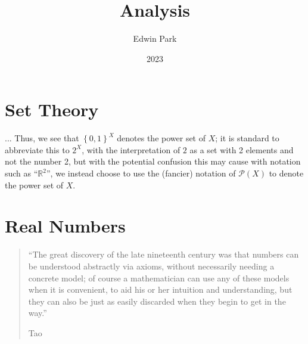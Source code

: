 \documentclass{article}
\title{Analysis}
\author{Edwin Park}
\date{2023}
\theoremstyle{definition}
\begin{document}
\clearpage\maketitle\thispagestyle{empty}
\newpage
\tableofcontents
\newpage\setcounter{page}{1}
\section{Set Theory}
... Thus, we see that $\left\{0,1\right\}^X$ denotes the power set of $X$; it is standard to abbreviate this to $2^X$, with the interpretation of $2$ as a set with 2 elements and not the number 2, but with the potential confusion this may cause with notation such as ``$\mathbb{R}^2$'',
we instead choose to use the (fancier) notation of $\mathscr{P}(X)$ to denote the power set of $X$.
\section{Real Numbers}
\begin{quotation}
	``The great discovery of the late nineteenth century was that numbers can be understood abstractly via axioms, without necessarily needing a concrete model; of course a mathematician can use any of these models when it is convenient, to aid his or her intuition and understanding, but they can also be just as easily discarded when they begin to get in the way.''
	\begin{flushright}
		Tao \cite[19]{taoanal1}
	\end{flushright}
\end{quotation}
\end{document}
